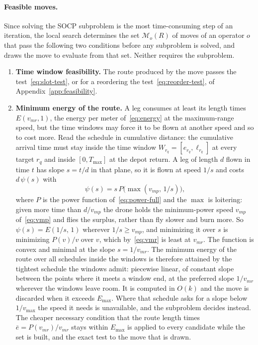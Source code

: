 \documentclass[11pt]{article}
\begin{document}
\paragraph{Feasible moves.}
Since solving the SOCP subproblem is the most time-consuming step of an iteration, the local search determines the set $\mathcal{M}_o(R)$ of moves of an operator $o$ that pass the following two conditions before any subproblem is solved, and draws the move to evaluate from that set. Neither requires the subproblem.
\begin{enumerate}[noitemsep, topsep=4pt, leftmargin=2em]
    \item \textbf{Time window feasibility.} The route produced by the move passes the test~\eqref{eq:slot-test}, or for a reordering the test~\eqref{eq:reorder-test}, of Appendix~\ref{app:feasibility}.
    \item \textbf{Minimum energy of the route.} A leg consumes at least its length times $E(v_{mr}, 1)$, the energy per meter of~\eqref{eq:energy} at the maximum-range speed, but the time windows may force it to be flown at another speed and so to cost more. Read the schedule in cumulative distance: the cumulative arrival time must stay inside the time window $W_{r_q} = [e_{r_q}, \ell_{r_q}]$ at every target $r_q$ and inside $[0, T_{\max}]$ at the depot return. A leg of length $d$ flown in time $t$ has slope $s = t/d$ in that plane, so it is flown at speed $1/s$ and costs $d\,\psi(s)$ with
    \begin{equation}\label{eq:psi}
        \psi(s) = s\, P\!\bigl(\max(v_{mp},\, 1/s)\bigr),
    \end{equation}
    where $P$ is the power function of~\eqref{eq:power-full} and the $\max$ is loitering: given more time than $d/v_{mp}$ the drone holds the minimum-power speed $v_{mp}$ of~\eqref{eq:vmp} and flies the surplus, rather than fly slower and burn more. So $\psi(s) = E(1/s,\, 1)$ wherever $1/s \ge v_{mp}$, and minimizing it over $s$ is minimizing $P(v)/v$ over $v$, which by~\eqref{eq:vmr} is least at $v_{mr}$. The function is convex and minimal at the slope $s = 1/v_{mr}$. The minimum energy of the route over all schedules inside the windows is therefore attained by the tightest schedule the windows admit: piecewise linear, of constant slope between the points where it meets a window end, at the preferred slope $1/v_{mr}$ wherever the windows leave room. It is computed in $O(k)$ and the move is discarded when it exceeds $E_{\max}$. Where that schedule asks for a slope below $1/v_{\max}$ the speed it needs is unavailable, and the subproblem decides instead. The cheaper necessary condition that the route length times $\bar{e} = P(v_{mr})/v_{mr}$ stays within $E_{\max}$ is applied to every candidate while the set is built, and the exact test to the move that is drawn.
\end{enumerate}
\end{document}
